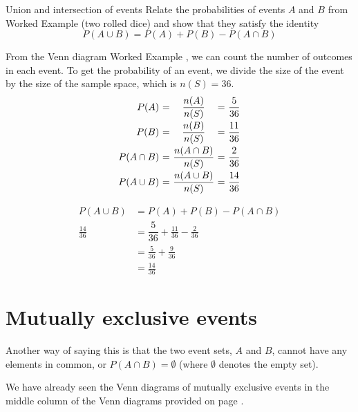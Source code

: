 \begin{wex}{Union and intersection of events}
{Relate the probabilities of events $A$ and $B$ from
  Worked Example 
  (two rolled dice) and show that they satisfy the identity
  \[P(A \cup B) = P(A) + P(B) - P(A \cap B)\]
}{
  
  From the Venn diagram
  Worked Example ,
 we can count the number of outcomes in each
  event. To get the probability of an event, we divide the size of
  the event by the size of the sample space, which is $n(S)=36$.
  \[\begin{array}{r@{$\ =\ $}c@{$\ =\ $}l}
    P(A)        & \dfrac{n(A)}{n(S)}        & \dfrac{5}{36}  \\[8pt]
    P(B)        & \dfrac{n(B)}{n(S)}        & \dfrac{11}{36} \\[8pt]
    P(A \cap B) & \dfrac{n(A \cap B)}{n(S)} & \dfrac{2}{36}  \\[8pt]
    P(A \cup B) & \dfrac{n(A \cup B)}{n(S)} & \dfrac{14}{36}
  \end{array}\]

  \begin{align*}
    P(A \cup B) &= P(A) + P(B) - P(A \cap B) \\
    \frac{14}{36} &= \dfrac{5}{36} + \frac{11}{36} - \frac{2}{36} \\
    &= \frac{5}{36} + \frac{9}{36} \\
    &= \frac{14}{36} 
  \end{align*}
}
\end{wex}

\section{Mutually exclusive events}

Another way of saying this is that the two event sets, $A$ and $B$,
cannot have any elements in common, or $P(A \cap B) = \emptyset$
(where $\emptyset$ denotes the empty set).

We have already seen the Venn diagrams of mutually exclusive events in
the middle column of the Venn diagrams provided on page \pageref{fig:venn_union_intersection}.


